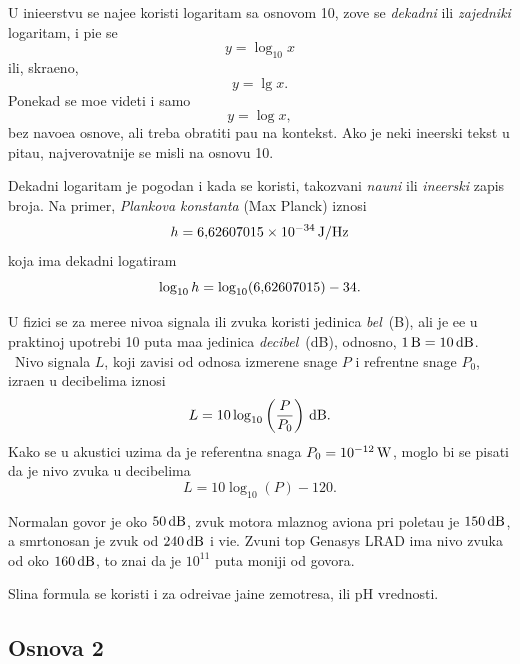 \documentclass[12pt, twoside, a4paper]{article}
\def\logten{\log_{10}}
\def\logtwo{\log_2}
\def\puta{\times}
\def\.{\smash{,}\vphantom{.}}
\def\um#1{\,{\rm#1}}
\begin{document}
U ini{\zv}e{\nj}erstvu se naj{\cv}e{\sv}{\cc}e koristi logaritam sa osnovom 10,
zove se {\sl dekadni\/} ili {\sl zajedni{\cv}ki\/} logaritam, i pi{\sv}e se
$$
y=\logten x
$$
ili, skra{\cc}eno,
$$
y=\lg x.
$$
Ponekad se mo{\zv}e videti i samo
$$
y=\log x,
$$
bez navo{\dj}e{\nj}a osnove, ali treba obratiti pa{\zv}{\nj}u na kontekst.
Ako je neki in{\zv}e{\nj}erski tekst u pita{\nj}u, najverovatnije se misli na osnovu 10.

Dekadni logaritam je pogodan i kada se koristi, takozvani {\sl nau{\cv}ni\/} ili {\sl in{\zv}e{\nj}erski\/}
zapis broja.
Na primer, {\sl Plankova konstanta\/} (Max Planck) iznosi
$$
h=6\.62607015\puta 10^{-34}\um{J/Hz}
$$
koja ima dekadni logatiram
$$
\logten h=\logten(6\.62607015) - 34.
$$

U fizici se za mere{\nj}e nivoa signala ili zvuka koristi jedinica {\sl be\/l}~(B), ali je {\cv}e{\sv}{\cc}e
u prakti{\cv}noj upotrebi 10 puta ma{\nj}a jedinica {\sl decibel\/}~(dB), odnosno, $1\um{B}=10\um{dB}$. \
Nivo \hbox{sig\-na\-la} $L$, koji zavisi
od odnosa izmerene snage $P$ i refrentne snage $P_0$, izra{\zv}en u deci\-belima iznosi
$$
L=10\logten\left(\frac{P}{P_0}\right)\um{dB}.
$$
Kako se u akustici uzima da je referentna snaga $P_0=10^{-12}\um W$, moglo bi se pisati
da je nivo zvuka u decibelima
$$
L=10\logten(P)-120.
$$

Normalan govor je oko $50\um{dB}$, 
zvuk motora mlaznog aviona pri poleta{\nj}u je $150\um{dB}$, 
a smrtonosan je zvuk od $240\um{dB}$ i vi{\sv}e.
Zvu{\cv}ni top {\sf Genasys LRAD} ima nivo zvuka od oko $160\um{dB}$,
{\sv}to zna{\cv}i da je $10^{11}$ puta mo{\cc}niji od govora.

Sli{\cv}na formula se koristi i za odre{\dj}iva{\nj}e ja{\cv}ine zem{\lj}otresa, 
ili pH
vrednosti.

\subsection{Osnova 2}\index{log2@$\logtwo$}

\def\lb{\mathop{\rm lb}}
\def\bits{{\it bits}}
\def\mant{{\it mantisa}}%
\def\expo{{\it eksponent}}%
\def\znak{{\it znak}}%
\end{document}
